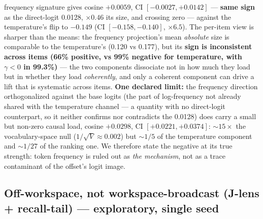 frequency signature gives cosine $\mathbf{+0.0059}$, CI $[-0.0027, +0.0142]$ ---
\textbf{same sign} as the direct-logit 0.0128, $\times0.46$ its size, and crossing
zero --- against the temperature's flip to $-0.149$ (CI $[-0.158, -0.140]$,
$\times6.5$). The per-item view is sharper than the means: the frequency
projection's mean \emph{absolute} size is comparable to the temperature's (0.120 vs
0.177), but its \textbf{sign is inconsistent across items (66\% positive, vs 99\%
negative for temperature, with $\gamma{<}0$ in 99.3\%)} --- the two components
dissociate not in how much they load but in whether they load \emph{coherently},
and only a coherent component can drive a lift that is systematic across items.
\textbf{One declared limit:} the frequency direction orthogonalized against the
base logits (the part of log-frequency not already shared with the temperature
channel --- a quantity with no direct-logit counterpart, so it neither confirms nor
contradicts the 0.0128) does carry a small but non-zero causal load, cosine
$\mathbf{+0.0298}$, CI $[+0.0221, +0.0374]$: ${\sim}15\times$ the vocabulary-space
null ($1/\sqrt{V} \approx 0.002$) but ${\sim}1/5$ of the temperature component and
${\sim}1/27$ of the ranking one. We therefore state the negative at its true
strength: token frequency is ruled out as \emph{the mechanism}, not as a trace
contaminant of the offset's logit image.

\subsection{Off-workspace, not workspace-broadcast (J-lens + recall-tail) ---
exploratory, single seed}\label{app:jlens}

